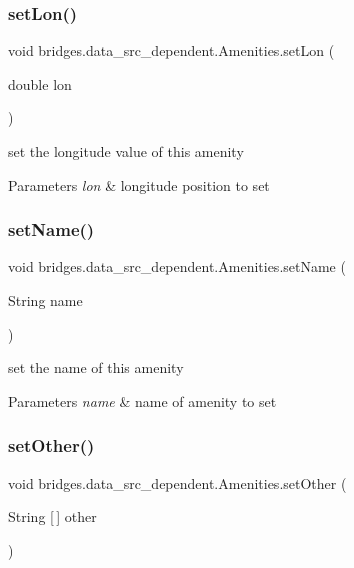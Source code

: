 \subsubsection{\texorpdfstring{set\+Lon()}{setLon()}}
{\footnotesize\ttfamily void bridges.\+data\+\_\+src\+\_\+dependent.\+Amenities.\+set\+Lon (\begin{DoxyParamCaption}\item[{double}]{lon }\end{DoxyParamCaption})}

set the longitude value of this amenity 
\begin{DoxyParams}{Parameters}
{\em lon} & longitude position to set \\
\hline
\end{DoxyParams}
\mbox{\label{classbridges_1_1data__src__dependent_1_1_amenities_a8149bb449a64db9da1401192905d4a73}} 
\subsubsection{\texorpdfstring{set\+Name()}{setName()}}
{\footnotesize\ttfamily void bridges.\+data\+\_\+src\+\_\+dependent.\+Amenities.\+set\+Name (\begin{DoxyParamCaption}\item[{String}]{name }\end{DoxyParamCaption})}

set the name of this amenity 
\begin{DoxyParams}{Parameters}
{\em name} & name of amenity to set \\
\hline
\end{DoxyParams}
\mbox{\label{classbridges_1_1data__src__dependent_1_1_amenities_ac2ad154f3864a4dc43f712c9b2a1588a}} 
\subsubsection{\texorpdfstring{set\+Other()}{setOther()}}
{\footnotesize\ttfamily void bridges.\+data\+\_\+src\+\_\+dependent.\+Amenities.\+set\+Other (\begin{DoxyParamCaption}\item[{String \mbox{[}$\,$\mbox{]}}]{other }\end{DoxyParamCaption})}

